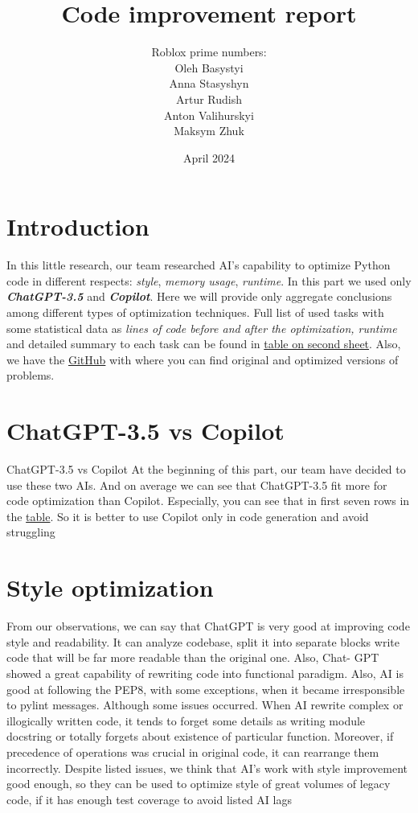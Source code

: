 \documentclass[12pt]{report}
\title{Code improvement report}
\author{Roblox prime numbers:\\\small{Oleh Basystyi}\\\small{Anna Stasyshyn}
	\\\small{Artur Rudish}\\\small{Anton Valihurskyi}\\\small{Maksym Zhuk}}
\date{April 2024}
\begin{document}
	\maketitle
	\renewcommand{\thesection}{\arabic{section}}
	\section{Introduction}
	In this little research, our team researched AI’s capability to optimize Python
	code in different respects: \textit{style}, \textit{memory usage}, \textit{runtime}. In this part we used
	only \textbf{\textit{ChatGPT-3.5}} and \textbf{\textit{Copilot}}. Here we will provide only aggregate
	conclusions among different types of optimization techniques. Full list of
	used tasks with some statistical data as \textit{lines of code before and after the
	optimization, runtime} and detailed summary to each task can be found in
	\href{https://docs.google.com/spreadsheets/d/1qXPyAJsOOpmtxIoGqObwG5mTaLU3IWO0SQRGbjZPhEc/edit#gid=0}{table on second sheet}. Also, we have the \href{https://github.com/n1n1n1q/Ai-benchmark/tree/main/Ai-tests/Style-and-Code-improvement}{GitHub} with where you can find original and optimized versions of problems.
	
	\section{ChatGPT-3.5 vs Copilot}
	
		ChatGPT-3.5 vs Copilot
		At the beginning of this part, our team have decided to use these two AIs.
		And on average we can see that ChatGPT-3.5 fit more for code optimization
		than Copilot. Especially, you can see that in first seven rows in the
		 \href{https://docs.google.com/spreadsheets/d/1qXPyAJsOOpmtxIoGqObwG5mTaLU3IWO0SQRGbjZPhEc/edit#gid=0}{table}.
		So it is better to use Copilot only in code generation and avoid struggling
		

	
	\section{Style optimization}
			
		From our observations, we can say that ChatGPT is very good at improving code style and readability. 
		It can analyze codebase, split it into separate
		blocks write code that will be far more readable than the original one. Also, Chat-
		GPT showed a great capability of rewriting code into functional paradigm.
		Also, AI is good at following the PEP8, with some exceptions, when it became
		irresponsible to pylint messages.
		Although some issues occurred. When AI rewrite complex or illogically
		written code, it tends to forget some details as writing module docstring or
		totally forgets about existence of particular function. Moreover, if precedence
		of operations was crucial in original code, it can rearrange them incorrectly.
		Despite listed issues, we think that AI’s work with style improvement good
		enough, so they can be used to optimize style of great volumes of legacy code,
		if it has enough test coverage to avoid listed AI lags
\end{document}
